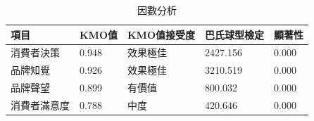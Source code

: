 \begin{table}[H]
\caption{因數分析}
\label{tab:p4}
\renewcommand{\arraystretch}{1.2} %
\arrayrulewidth=1pt               %
\tabcolsep=16pt                   %
\begin{tabular}[t]{lllll}  %
\hline
 項目& KMO值 & KMO值接受度& 巴氏球型檢定&顯著性 \\
\hline
消費者決策&0.948&效果極佳&2427.156&0.000\\
 品牌知覺&0.926&效果極佳&3210.519&0.000\\
 品牌聲望&0.899&有價值&800.032&0.000 \\
消費者滿意度&0.788&中度&420.646&0.000\\
\hline
\end{tabular}
\end{table}


